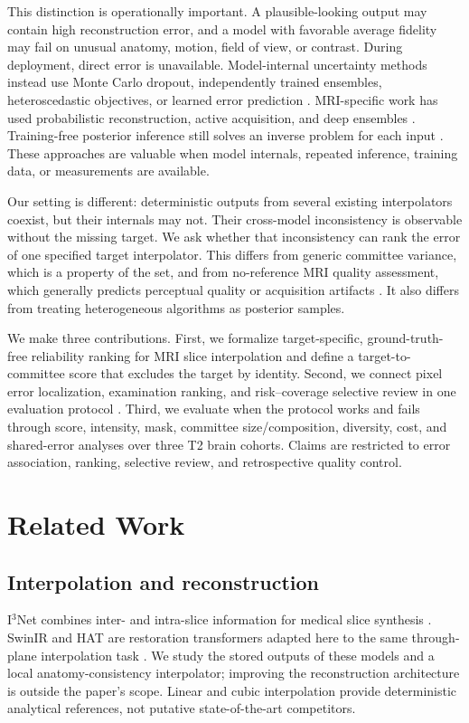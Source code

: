 \documentclass{article}
\begin{document}
This distinction is operationally important. A plausible-looking output may contain high reconstruction error, and a model with favorable average fidelity may fail on unusual anatomy, motion, field of view, or contrast. During deployment, direct error is unavailable. Model-internal uncertainty methods instead use Monte Carlo dropout, independently trained ensembles, heteroscedastic objectives, or learned error prediction \cite{gal2016dropout,kendall2017uncertainties,lakshminarayanan2017deepensembles,hu2021predict}. MRI-specific work has used probabilistic reconstruction, active acquisition, and deep ensembles \cite{edupuganti2021uqmri,zhang2019active,kuestner2024ensembles}. Training-free posterior inference still solves an inverse problem for each input \cite{zhang2024trainingfree}. These approaches are valuable when model internals, repeated inference, training data, or measurements are available.

Our setting is different: deterministic outputs from several existing interpolators coexist, but their internals may not. Their cross-model inconsistency is observable without the missing target. We ask whether that inconsistency can rank the error of one specified target interpolator. This differs from generic committee variance, which is a property of the set, and from no-reference MRI quality assessment, which generally predicts perceptual quality or acquisition artifacts \cite{stepien2022nriqa}. It also differs from treating heterogeneous algorithms as posterior samples.

We make three contributions. First, we formalize target-specific, ground-truth-free reliability ranking for MRI slice interpolation and define a target-to-committee score that excludes the target by identity. Second, we connect pixel error localization, examination ranking, and risk--coverage selective review in one evaluation protocol \cite{elyaniv2010selective,ding2020aurc}. Third, we evaluate when the protocol works and fails through score, intensity, mask, committee size/composition, diversity, cost, and shared-error analyses over three T2 brain cohorts. Claims are restricted to error association, ranking, selective review, and retrospective quality control.

\section{Related Work}

\subsection{Interpolation and reconstruction}
I$^3$Net combines inter- and intra-slice information for medical slice synthesis \cite{song2024i3net}. SwinIR and HAT are restoration transformers adapted here to the same through-plane interpolation task \cite{liang2021swinir,chen2022hat}. We study the stored outputs of these models and a local anatomy-consistency interpolator; improving the reconstruction architecture is outside the paper's scope. Linear and cubic interpolation provide deterministic analytical references, not putative state-of-the-art competitors.
\end{document}
